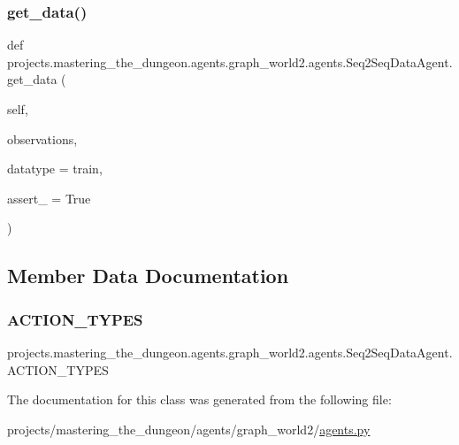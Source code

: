 \subsubsection{\texorpdfstring{get\+\_\+data()}{get\_data()}}
{\footnotesize\ttfamily def projects.\+mastering\+\_\+the\+\_\+dungeon.\+agents.\+graph\+\_\+world2.\+agents.\+Seq2\+Seq\+Data\+Agent.\+get\+\_\+data (\begin{DoxyParamCaption}\item[{}]{self,  }\item[{}]{observations,  }\item[{}]{datatype = {\ttfamily \textquotesingle{}train\textquotesingle{}},  }\item[{}]{assert\+\_\+ = {\ttfamily True} }\end{DoxyParamCaption})}



\subsection{Member Data Documentation}
\mbox{\label{classprojects_1_1mastering__the__dungeon_1_1agents_1_1graph__world2_1_1agents_1_1Seq2SeqDataAgent_a698d961e03b940ec4ff537c209a9da02}} 
\subsubsection{\texorpdfstring{A\+C\+T\+I\+O\+N\+\_\+\+T\+Y\+P\+ES}{ACTION\_TYPES}}
{\footnotesize\ttfamily projects.\+mastering\+\_\+the\+\_\+dungeon.\+agents.\+graph\+\_\+world2.\+agents.\+Seq2\+Seq\+Data\+Agent.\+A\+C\+T\+I\+O\+N\+\_\+\+T\+Y\+P\+ES}



The documentation for this class was generated from the following file\+:\begin{DoxyCompactItemize}
\item 
projects/mastering\+\_\+the\+\_\+dungeon/agents/graph\+\_\+world2/\hyperlink{projects_2mastering__the__dungeon_2agents_2graph__world2_2agents_8py}{agents.\+py}\end{DoxyCompactItemize}
